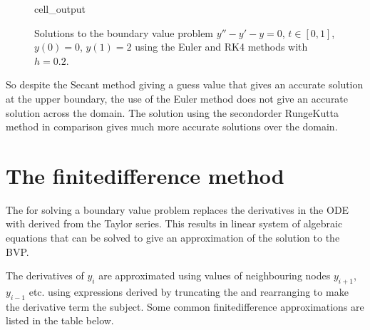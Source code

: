 \documentclass[letterpaper,10pt,english]{jupyterBook}
\begin{document}
\begin{figure}[htbp]
\centering
\capstart
\begin{sphinxVerbatimOutput}

\begin{sphinxuseclass}{cell_output}
\noindent{}

\end{sphinxuseclass}\end{sphinxVerbatimOutput}
\caption{Solutions to the boundary value problem \(y'' - y' - y = 0\), \(t \in [0,1]\), \(y(0) = 0\), \(y(1) = 2\) using the Euler and RK4 methods with \(h=0.2\).}\label{\detokenize{5_BVPs/5.1_Shooting_method:bvp-euler-rk4-figure}}\end{figure}

\sphinxAtStartPar
So despite the Secant method giving a guess value that gives an accurate solution at the upper boundary, the use of the Euler method does not give an accurate solution across the domain. The solution using the second\sphinxhyphen{}order Runge\sphinxhyphen{}Kutta method in comparison gives much more accurate solutions over the domain.

\sphinxstepscope


\section{The finite\sphinxhyphen{}difference method}
\label{\detokenize{5_BVPs/5.2_Finite_difference_method:the-finite-difference-method}}\label{\detokenize{5_BVPs/5.2_Finite_difference_method:finite-difference-method-section}}\label{\detokenize{5_BVPs/5.2_Finite_difference_method::doc}}
\sphinxAtStartPar
The  for solving a boundary value problem replaces the derivatives in the ODE with  derived from the Taylor series. This results in linear system of algebraic equations that can be solved to give an approximation of the solution to the BVP.

\sphinxAtStartPar
The derivatives of \(y_i\) are approximated using values of neighbouring nodes \(y_{i+1}\), \(y_{i-1}\) etc. using expressions derived by truncating the {\hyperref[\detokenize{1_IVPs/1.1_Taylor_Series:taylor-series-definition}]{}} and rearranging to make the derivative term the subject. Some common finite\sphinxhyphen{}difference approximations are listed in the table below.
\end{document}

